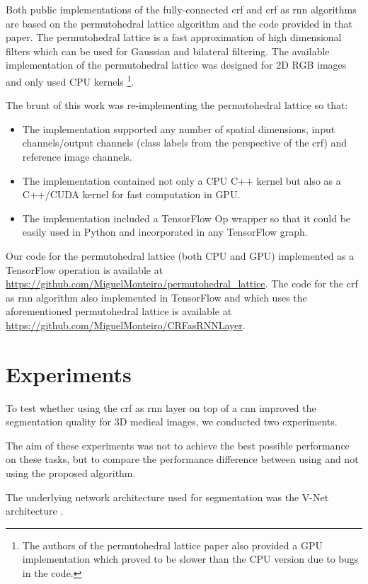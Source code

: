 \documentclass{article}
\begin{document}
Both public implementations of the fully-connected \gls{crf} and \gls{crf} as \gls{rnn} algorithms are based on the permutohedral lattice algorithm \cite{adams2010fast} and the code provided in that paper.
The permutohedral lattice is a fast approximation of high dimensional filters which can be used for Gaussian and bilateral filtering.
The available implementation of the permutohedral lattice was designed for 2D RGB images and only used CPU kernels \footnote{The authors of the permutohedral lattice paper also provided a GPU implementation which proved to be slower than the CPU version due to bugs in the code.}.

The brunt of this work was re-implementing the permutohedral lattice so that:
\begin{itemize}
    \item The implementation supported any number of spatial dimensions, input channels/output channels (class labels from the perspective of the \gls{crf}) and reference image channels. 
    \item The implementation contained not only a CPU C++ kernel but also as a C++/CUDA kernel for fast computation in GPU.
    \item The implementation included a TensorFlow Op wrapper so that it could be easily used in Python and incorporated in any TensorFlow graph.
\end{itemize}

Our code for the permutohedral lattice (both CPU and GPU) implemented as a TensorFlow operation is available at \url{https://github.com/MiguelMonteiro/permutohedral_lattice}.
The code for the \gls{crf} as \gls{rnn} algorithm also implemented in TensorFlow and which uses the aforementioned permutohedral lattice is available at \url{https://github.com/MiguelMonteiro/CRFasRNNLayer}.

\section{Experiments}

To test whether using the \gls{crf} as \gls{rnn} layer on top of a \gls{cnn} improved the segmentation quality for 3D medical images, we conducted two experiments.

The aim of these experiments was not to achieve the best possible performance on these tasks, but to compare the performance difference between using and not using the proposed algorithm.

The underlying network architecture used for segmentation was the V-Net architecture \cite{VNet}.
\end{document}
